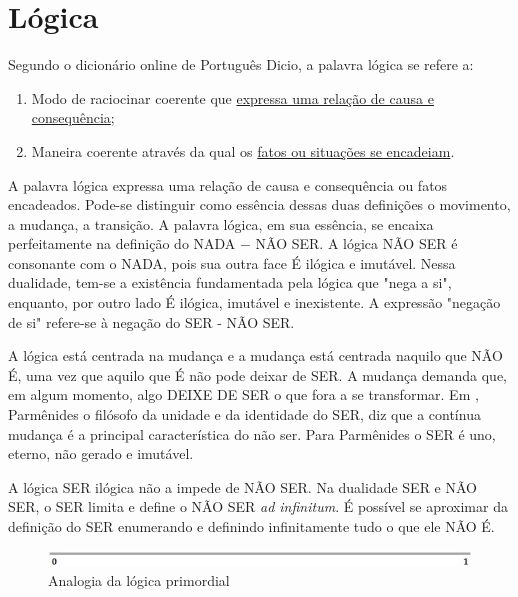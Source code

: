 \section{Lógica}
Segundo o dicionário online de Português Dicio\cite{dicio_logica}, a palavra lógica se refere a:
\begin{enumerate}
   \item Modo de raciocinar coerente que \underline{expressa uma relação de causa e consequência};
   \item Maneira coerente através da qual os \underline{fatos ou situações se encadeiam}. 
\end{enumerate}
 
\bigbreak
A palavra lógica expressa uma relação de causa e consequência ou fatos encadeados. Pode-se distinguir como essência dessas duas definições o movimento, a mudança, a transição. A palavra lógica, em sua essência, se encaixa perfeitamente na definição do NADA − NÃO SER.  A lógica NÃO SER é consonante com o NADA, pois sua outra face É ilógica e imutável. Nessa dualidade, tem-se a existência fundamentada pela lógica que "nega a si", enquanto, por outro lado É ilógica, imutável e inexistente. A expressão "negação de si" refere-se à negação do SER - NÃO SER. 

A lógica está centrada na mudança e a mudança está centrada naquilo que NÃO É, uma vez que aquilo que É não pode deixar de SER. A mudança demanda que, em algum momento, algo DEIXE DE SER o que fora a se transformar. Em , Parmênides  o filósofo da unidade e da identidade do SER, diz que a contínua mudança é a principal característica do não ser. Para Parmênides o SER é uno, eterno, não gerado e imutável.

A lógica SER ilógica não a impede de NÃO SER.  Na dualidade SER e NÃO SER, o SER limita e define o NÃO SER \textit{ad infinitum}. É possível se aproximar da definição do SER enumerando e definindo infinitamente tudo o que ele NÃO É.

\begin{figure}[H]
\caption{Analogia da lógica primordial}
\label{fig:primordial_logic_representation}
\centering
\includegraphics[scale=1]{sections/images/primordial_logic_representation.jpg}
\end{figure}

